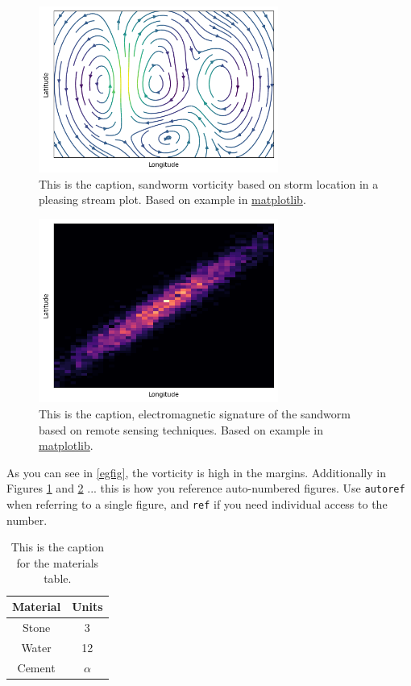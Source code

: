 \begin{figure}[]
    \includegraphics[width=0.7\textwidth]{figure1.png}
    \caption{This is the caption, sandworm vorticity based on storm location in a pleasing stream plot. Based on example in \href{https://matplotlib.org/stable/plot_types/arrays/streamplot.html}{matplotlib}. \label{egfig}}
\end{figure}


\begin{figure}[]
    \includegraphics[width=0.7\textwidth]{figure2.png}
    \caption{This is the caption, electromagnetic signature of the sandworm based on remote sensing techniques. Based on example in \href{https://matplotlib.org/stable/plot_types/stats/hist2d.html}{matplotlib}. \label{egfig2}}
\end{figure}

As you can see in \autoref{egfig}, the vorticity is high in the margins. Additionally in Figures \ref{egfig} and \ref{egfig2} ... this is how you reference auto-numbered figures.
Use \texttt{autoref} when referring to a single figure, and \texttt{ref} if you need individual access to the number.

\begin{table}
    \centering
    \caption{This is the caption for the materials table.\label{mtable}}
    \begin{tabular}{cc}
    \toprule
    \textbf{Material} & \textbf{Units} \\
    \midrule
    Stone & 3 \\
    Water & 12 \\
    Cement & $\alpha$ \\
    \bottomrule
    \end{tabular}
\end{table}

